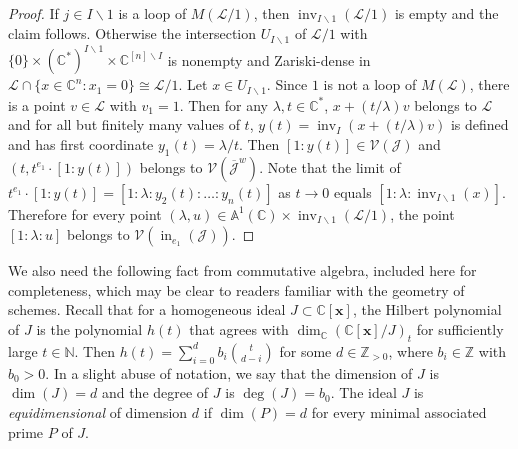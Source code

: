 \documentclass[10pt]{amsart}
\theoremstyle{definition}
\newcommand{\N}{\mathbb{N}}
\newcommand{\Z}{\mathbb{Z}}
\newcommand{\Cbb}{\mathbb{C}}
\newcommand{\V}{\mathcal{V}}
\newcommand{\J}{\mathcal{J}}
\newcommand{\cL}{\mathcal{L}}
\newcommand{\x}{\mathbf{x}}
\newcommand{\ol}{\overline}
\DeclareMathOperator{\In}{in}
\DeclareMathOperator{\inv}{inv}
\begin{document}
\begin{proof}
If $j\in I\backslash 1$ is a loop of $M(\cL/1)$, then $\inv_{I\backslash 1}(\cL/1)$ is empty and 
the claim follows. Otherwise the intersection $U_{I\backslash 1}$ of $\cL/1$ with $\{0\}\times (\Cbb^*)^{I\backslash 1} \times \Cbb^{[n]\backslash I}$ is nonempty and Zariski-dense in $\cL\cap \{x\in \Cbb^n: x_1=0\} \cong \cL/1$. 
Let $x \in U_{I\backslash 1}$. Since $1$ is not a loop of $M(\cL)$, 
there is a point $v \in \cL$ with $v_1 = 1$. Then for any $\lambda, t\in \Cbb^*$,
$x+ (t/\lambda)v$ belongs to $\cL$ and for all but finitely many values of $t$, $y(t) = \inv_I(x+ (t/\lambda)v)$
is defined and has first coordinate $y_1(t) = \lambda/t$. 
Then $[1: y(t)] \in \V(\J)$ and $(t, t^{e_1}\cdot [1:y(t)])$ belongs to $\V\left(\ol{\J}^w\right)$. 
Note that the limit of $t^{e_1}\cdot [1:y(t)] = [1:\lambda : y_2(t): \ldots :y_n(t)]$ as $t\rightarrow 0$ equals $[1:\lambda: \inv_{I\backslash 1}(x)]$. 
Therefore for every point $(\lambda,u)\in \mathbb{A}^1(\Cbb)\times \inv_{I\backslash 1}(\cL/1)$, the point $[1:\lambda: u]$ belongs to $\V\left(\In_{e_1}(\J)\right)$. \end{proof}


We also need the following fact from commutative algebra, included here for completeness, 
which may be clear to readers familiar with the geometry of schemes. 
Recall that for a homogeneous ideal $J \subset \Cbb[\x]$, the Hilbert polynomial of $J$ is 
the polynomial $h(t)$ that agrees with $\dim_\Cbb(\Cbb[\x]/J)_t$ for sufficiently large $t \in \N$. 
Then $ h(t) = \sum_{i=0}^d b_i \binom{t}{d-i}$ for some $d\in \Z_{>0}$, where $b_i\in \Z$ with $b_0>0$.
In a slight abuse of notation, we say that the dimension of $J$ is $\dim(J) = d$ and the degree of $J$ is $\deg(J) = b_0$. 
The ideal $J$ is \emph{equidimensional} of dimension $d$ if $\dim(P)=d$ for every minimal associated prime $P$ of $J$. 
\end{document}
